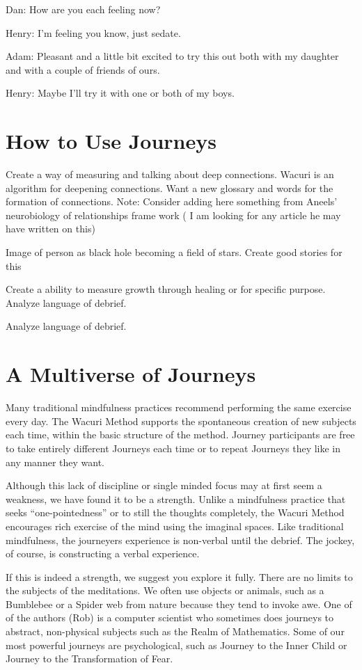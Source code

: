 \documentclass[12pt]{book}
\begin{document}
Dan: How are you each feeling now?

Henry: I'm feeling you know, just sedate.

Adam: Pleasant and a little bit excited to try this out both with my daughter and with a couple of friends of ours.

Henry: Maybe I'll try it with one or both of my boys.




\chapter{How to Use Journeys}


Create a way of measuring and talking about deep connections. Wacuri is an algorithm for deepening connections. Want a new glossary and words for the formation of connections. Note: Consider adding here something from Aneels’ neurobiology of relationships frame work ( I am looking for any article he may have written on this)

Image of person as black hole becoming a field of stars. Create good stories for this

Create a ability to measure growth through healing or for specific purpose. Analyze language of debrief.


Analyze language of debrief.

\chapter{ A Multiverse of Journeys}

Many traditional mindfulness practices recommend performing the same exercise every day. The Wacuri Method supports the spontaneous creation of new subjects each time, within the basic structure of the method. Journey participants are free to take entirely different Journeys each time or to repeat Journeys they like in any manner they want.
					
Although this lack of discipline or single minded focus may at first seem a weakness, we have found it to be a strength. Unlike a mindfulness practice that seeks “one-pointedness” or to still the thoughts completely, the Wacuri Method encourages rich exercise of the mind using the imaginal spaces. Like traditional mindfulness, the journeyers experience is non-verbal until the debrief. The jockey, of course, is constructing a verbal experience.
					
If this is indeed a strength, we suggest you explore it fully. There are no limits to the subjects of the meditations. We often use objects or animals, such as a Bumblebee or a Spider web from nature because they tend to invoke awe. One of of the authors (Rob) is a computer scientist who sometimes does journeys to abstract, non-physical subjects such as the Realm of Mathematics. Some of our most powerful journeys are psychological, such as Journey to the Inner Child or Journey to the Transformation of Fear.
					
\end{document}

